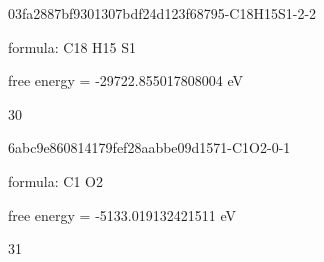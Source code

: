 \documentclass{article}
\begin{document}
\vspace{1cm}


03fa2887bf9301307bdf24d123f68795-C18H15S1-2-2



formula: C18 H15 S1



free energy = -29722.855017808004 eV

30

\vspace{1cm}


6abc9e860814179fef28aabbe09d1571-C1O2-0-1



formula: C1 O2



free energy = -5133.019132421511 eV

31
\end{document}

